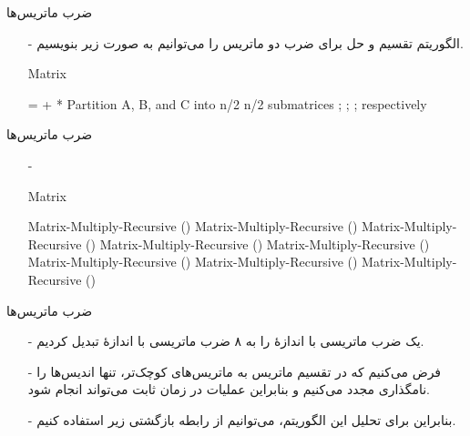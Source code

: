 \begin{frame}{‌ضرب ماتریس‌ها}
\begin{itemize}\itemr
\item[-]
الگوریتم تقسیم و حل برای ضرب دو ماتریس را می‌توانیم به صورت زیر بنویسیم.
\begin{algorithm}[H]\alglr
  \caption{Matrix} 
  \begin{algorithmic}[1]
   \Statex {}    
    	\State {} =  +  
    	\State \Return
    \EndIf
   \Statex {}
   \State Partition A, B, and C into n/2 \mc{\times} n/2 submatrices 
    	\Statex {}; 
    	\Statex {};
    	\Statex {}; respectively    
  \end{algorithmic}
  \label{alg:merge}
\end{algorithm}
\end{itemize}
\end{frame}


\begin{frame}{‌ضرب ماتریس‌ها}
\begin{itemize}\itemr
\item[-]
\begin{algorithm}[H]\alglr
  \caption{Matrix} 
  \begin{algorithmic}[1]
    \setcounter{ALG@line}{4}
   \Statex {}   
    	\State Matrix-Multiply-Recursive ()
    	\State Matrix-Multiply-Recursive ()
    	\State Matrix-Multiply-Recursive ()
    	\State Matrix-Multiply-Recursive ()
    	\State Matrix-Multiply-Recursive ()
    	\State Matrix-Multiply-Recursive ()
    	\State Matrix-Multiply-Recursive ()
    	\State Matrix-Multiply-Recursive ()
  \end{algorithmic}
  \label{alg:merge}
\end{algorithm}
\end{itemize}
\end{frame}


\begin{frame}{‌ضرب ماتریس‌ها}
\begin{itemize}\itemr
\item[-]
یک ضرب ماتریسی با اندازهٔ 
 را به ۸ ضرب ماتریسی با اندازهٔ 
تبدیل کردیم.
\item[-]
فرض می‌کنیم که در تقسیم ماتریس به ماتریس‌های کوچک‌تر، تنها اندیس‌ها را نامگذاری مجدد می‌کنیم و بنابراین عملیات در زمان ثابت می‌تواند انجام شود.
\item[-]
بنابراین برای تحلیل این الگوریتم، می‌توانیم از رابطه بازگشتی زیر استفاده کنیم.
\begin{center}
\end{center}
\end{itemize}
\end{frame}


